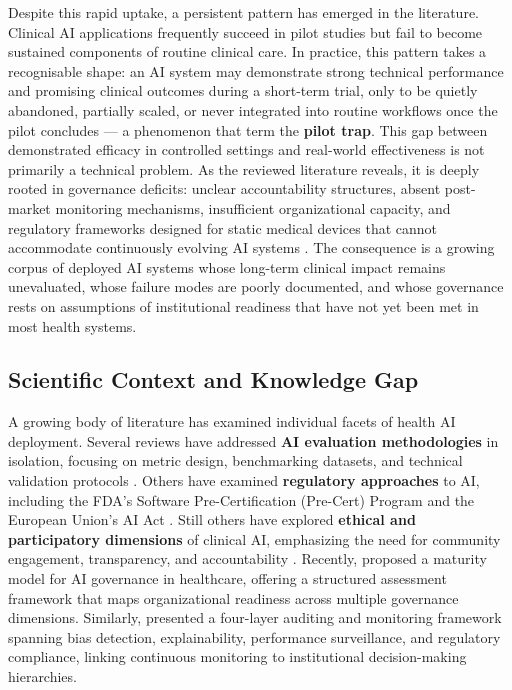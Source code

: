Despite this rapid uptake, a persistent pattern has emerged in the literature. Clinical AI applications frequently succeed in pilot studies but fail to become sustained components of routine clinical care. In practice, this pattern takes a recognisable shape: an AI system may demonstrate strong technical performance and promising clinical outcomes during a short-term trial, only to be quietly abandoned, partially scaled, or never integrated into routine workflows once the pilot concludes --- a phenomenon that \citet{tian2026pilottrap} term the \textbf{pilot trap}. This gap between demonstrated efficacy in controlled settings and real-world effectiveness is not primarily a technical problem. As the reviewed literature reveals, it is deeply rooted in governance deficits: unclear accountability structures, absent post-market monitoring mechanisms, insufficient organizational capacity, and regulatory frameworks designed for static medical devices that cannot accommodate continuously evolving AI systems \citep{abulibdeh2025illusion,pham2025ethical}. The consequence is a growing corpus of deployed AI systems whose long-term clinical impact remains unevaluated, whose failure modes are poorly documented, and whose governance rests on assumptions of institutional readiness that have not yet been met in most health systems.


\subsection{Scientific Context and Knowledge Gap}
\label{sec:scientific_context}

A growing body of literature has examined individual facets of health AI deployment. Several reviews have addressed \textbf{AI evaluation methodologies} in isolation, focusing on metric design, benchmarking datasets, and technical validation protocols \citep[see e.g.][]{pham2025ethical}. Others have examined \textbf{regulatory approaches} to AI, including the FDA's Software Pre-Certification (Pre-Cert) Program and the European Union's AI Act \citep{warraich2024fda}. Still others have explored \textbf{ethical and participatory dimensions} of clinical AI, emphasizing the need for community engagement, transparency, and accountability \citep{bouderhem2025shaping}. Recently, \citet{hussein2026governance} proposed a maturity model for AI governance in healthcare, offering a structured assessment framework that maps organizational readiness across multiple governance dimensions. Similarly, \citet{palama2026auditing} presented a four-layer auditing and monitoring framework spanning bias detection, explainability, performance surveillance, and regulatory compliance, linking continuous monitoring to institutional decision-making hierarchies.

